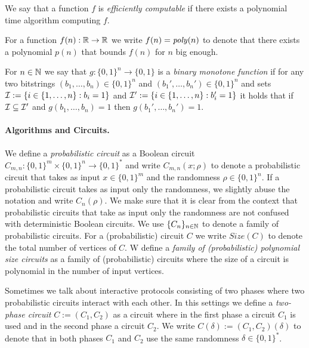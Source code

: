 We say that a function $f$ is \textit{efficiently computable} if there exists a polynomial time algorithm computing $f$.

For a function $f(n): \mathbb{R} \rightarrow \mathbb{R}$ we write $f(n) = \operatorname{\mathit{poly}}(n)$ to denote that there exists a polynomial $p(n)$ that
bounds $f(n)$ for $n$ big enough.

\begin{definition}
For $n \in \mathbb{N}$ we say that $g: \{0,1\}^n \rightarrow \{0,1\}$ is a \textit{binary monotone function}
if for any two bitstrings $(b_1, \dotsc, b_n) \in \{0,1\}^{n}$ and $(b_1', \dotsc, b_n') \in \{0,1\}^{n}$
and sets $\mathcal{I} := \{i \in \{1,\dotsc, n\}: b_i = 1\}$ and $\mathcal{I}' := \{i \in \{1,\dotsc, n\} : b_i' = 1\}$ it holds
that if $\mathcal{I} \subseteq \mathcal{I}'$ and $g(b_1, \dotsc, b_n) = 1$ then $g(b_1', \dotsc, b_n') = 1$.
\end{definition}

\paragraph{Algorithms and Circuits.}
We define a \textit{probabilistic circuit} as a Boolean circuit $C_{m,n} : \{0,1\}^{m} \times \{0,1\}^{n} \rightarrow \{0,1\}^{*}$ and
write $C_{m,n}(x;\rho)$ to denote a probabilistic circuit that takes as input $x \in \{0,1\}^{m}$ and the randomness $\rho \in \{0,1\}^{n}$.
If a probabilistic circuit takes as input only the randomness, we slightly abuse the notation and write $C_{n}(\rho)$.
We make sure that it is clear from the context that probabilistic circuits that take as input only the randomness
are not confused with deterministic Boolean circuits. We use $\{C_n\}_{n \in \mathbb{N}}$ to denote a family of probabilistic circuits.
For a (probabilistic) circuit $C$ we write $\mathit{Size}(C)$ to denote the total number of vertices of $C$.
W define a \textit{family of (probabilistic) polynomial size circuits} as a family of (probabilistic) circuits where
the size of a circuit is polynomial in the number of input vertices.

Sometimes we talk about interactive protocols consisting of two phases where two probabilistic circuits interact with each other.
In this settings we define a \textit{two-phase circuit} $C := (C_1, C_2)$ as a circuit
where in the first phase a circuit $C_1$ is used and in the second phase a circuit $C_2$.
We write $C(\delta) := (C_1, C_2)(\delta)$ to denote that in both phases $C_1$ and $C_2$ use the same randomness $\delta \in \{0,1\}^{*}$.

